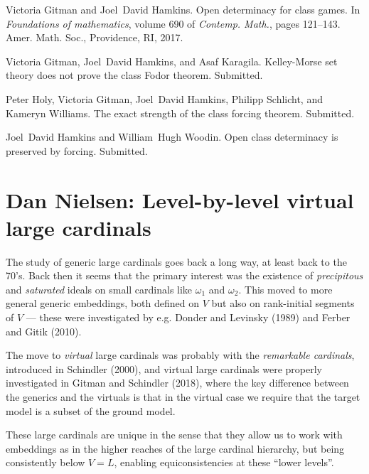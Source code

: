 \documentclass{amsart}
\theoremstyle{definition}
\begin{document}
%
%

\begin{thebibliography}{SNW19}

Victoria Gitman and Joel~David Hamkins.
\newblock Open determinacy for class games.
\newblock In {\em Foundations of mathematics}, volume 690 of {\em Contemp.
  Math.}, pages 121--143. Amer. Math. Soc., Providence, RI, 2017.

Victoria Gitman, Joel~David Hamkins, and Asaf Karagila.
\newblock Kelley-{M}orse set theory does not prove the class {F}odor theorem.
\newblock Submitted.

Peter Holy, Victoria Gitman, Joel~David Hamkins, Philipp Schlicht, and Kameryn
  Williams.
\newblock The exact strength of the class forcing theorem.
\newblock Submitted.

Joel~David Hamkins and William~Hugh Woodin.
\newblock Open class determinacy is preserved by forcing.
\newblock Submitted.

\end{thebibliography}



\section{Dan Nielsen: Level-by-level virtual large cardinals}

The study of generic large cardinals goes back a long way, at least back to the 70's. Back then it seems that the primary interest was the existence of \textit{precipitous} and \textit{saturated} ideals on small cardinals like $\omega_1$ and $\omega_2$. This moved to more general generic embeddings, both defined on $V$ but also on rank-initial segments of $V$ --- these were investigated by e.g. Donder and Levinsky (1989) and Ferber and Gitik (2010).

The move to \textit{virtual} large cardinals was probably with the \textit{remarkable cardinals}, introduced in Schindler (2000), and virtual large cardinals were properly investigated in Gitman and Schindler (2018), where the key difference between the generics and the virtuals is that in the virtual case we require that the target model is a subset of the ground model.

These large cardinals are unique in the sense that they allow us to work with embeddings as in the higher reaches of the large cardinal hierarchy, but being consistently below $V=L$, enabling equiconsistencies at these ``lower levels''.
\end{document}

